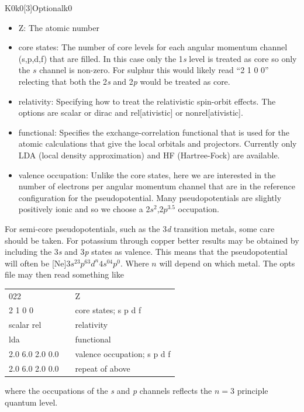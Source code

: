 \documentclass[11pt]{report}
\begin{document}
\begin{Card}{K0}{k0[3]}{Optional}{k0}
\begin{itemize}
\item Z: The atomic number
\item core states: The number of core levels for each angular momentum channel (s,p,d,f) that are filled. In this case only the 1{\it s} level is treated as core so only the $s$ channel is non-zero. For sulphur this would likely read ``2 1 0 0'' relecting that both the 2{\it s} and 2{\it p} would be treated as core.
\item relativity: Specifying how to treat the relativistic spin-orbit effects. The options are scalar or dirac and rel[ativistic] or nonrel[ativistic].
\item functional: Specifies the exchange-correlation functional that is used for the atomic calculations that give the local orbitals and projectors. Currently only LDA (local density approximation) and HF (Hartree-Fock) are available.
\item valence occupation: Unlike the core states, here we are interested in the number of electrons per angular momentum channel that are in the reference configuration for the pseudopotential. Many pseudopotentials are slightly positively ionic and so we choose a 2$s^2$,2$p^{3.5}$ occupation. 
\end{itemize}


For semi-core pseudopotentials, such as the 3{\it d} transition metals, some care should be taken. 
For potassium through copper better results may be obtained by including the 3{\it s} and 3{\it p} states as valence. 
This means that the pseudopotential will often be [Ne]$3s^23p^63d^n4s^04p^0$. 
Where $n$ will depend on which metal. 
The opts file may then read something like 
\begin{center}
\begin{tabular}{| l | c l |}
\hline
022				& &  Z\\
2 1 0 0			& & core states; s p d f \\
scalar rel			& & relativity \\
lda				& & functional \\
2.0 6.0 2.0 0.0		& & valence occupation; s p d f \\
2.0 6.0 2.0 0.0		& & repeat of above \\
\hline
\end{tabular}
\end{center}
where the occupations of the {\it s} and {\it p} channels reflects the $n=3$ principle quantum level.




\end{Card}
\end{document}
